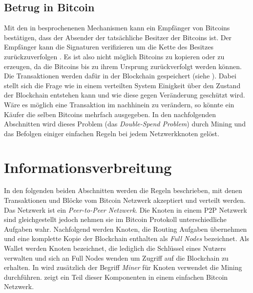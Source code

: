 \documentclass[ngerman,runningheads,a4paper]{llncs}[2018/03/10]
\begin{document}
\subsection{Betrug in Bitcoin}\label{sec:betrug}

Mit den in  besprochenenen Mechanismen kann ein Empfänger von Bitcoins bestätigen, dass der Absender der tatsächliche Besitzer der Bitcoins ist. Der Empfänger kann die Signaturen verifizieren um die Kette des Besitzes zurückzuverfolgen \citep{bitcoinPDF}. Es ist also nicht möglich Bitcoins zu kopieren oder zu erzeugen, da die Bitcoins bis zu ihrem Ursprung zurückverfolgt werden können. Die Transaktionen werden dafür in der Blockchain gespeichert (siehe ). Dabei stellt sich die Frage wie in einem verteilten System Einigkeit über den Zustand der Blockchain entstehen kann und wie diese gegen Veränderung geschützt wird. Wäre es möglich eine Transaktion im nachhinein zu verändern, so könnte ein Käufer die selben Bitcoins mehrfach ausgegeben. In den nachfolgenden Abschnitten wird dieses Problem (das \textit{Double-Spend Problem}) durch Mining und das Befolgen einiger einfachen Regeln bei jedem Netzwerkknoten gelöst.


\section{Informationsverbreitung}\label{sec:informationsverbreitung}

In den folgenden beiden Abschnitten werden die Regeln beschrieben, mit denen Transaktionen und Blöcke vom Bitcoin Netzwerk akzeptiert und verteilt werden. Das Netzwerk ist ein \textit{Peer-to-Peer Netzwerk}. Die Knoten in einem P2P Netzwerk sind gleichgestellt jedoch nehmen sie im Bitcoin Protokoll unterschiedliche Aufgaben wahr. Nachfolgend werden Knoten, die Routing Aufgaben übernehmen und eine komplette Kopie der Blockchain enthalten als \textit{Full Nodes} bezeichnet. Als Wallet werden Knoten bezeichnet, die lediglich die Schlüssel eines Nutzers verwalten und sich an Full Nodes wenden um Zugriff auf die Blockchain zu erhalten. In  wird zusätzlich der Begriff \textit{Miner} für Knoten verwendet die Mining durchführen.  zeigt ein Teil dieser Komponenten in einem einfachen Bitcoin Netzwerk. 
\end{document}
